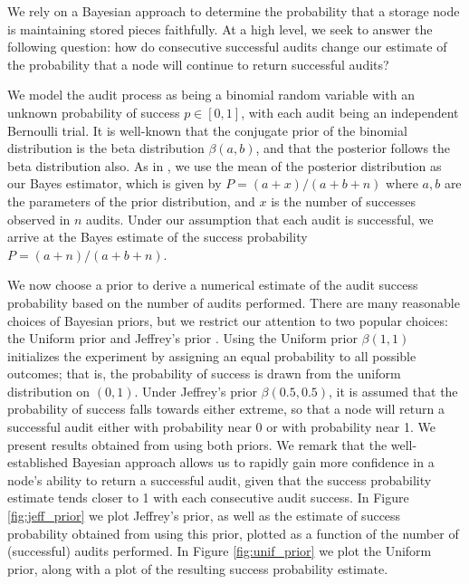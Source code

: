 We rely on a Bayesian approach to determine the probability
that a storage node is maintaining stored pieces faithfully.
At a high level, we seek to answer the following question:
how do consecutive successful audits change our estimate of
the probability that a node will continue to return successful audits?

We model the audit process as being a binomial random variable
with an unknown probability of success $p\in[0,1]$, with each audit
being an independent Bernoulli trial.
It is well-known that the conjugate prior of the binomial distribution
is the beta distribution $\beta(a,b)$,
and that the posterior follows the beta distribution also.
As in \cite{tumor-occurrence},
we use the mean of the posterior distribution as our Bayes
estimator, which is given by $P=(a+x)/(a+b+n)$ where $a,b$ are the parameters of
the prior distribution, and $x$ is the number of successes observed in $n$ audits.
Under our assumption that each audit is successful,
we arrive at the Bayes estimate of the success probability $P=(a+n)/(a+b+n)$.

We now choose a prior to derive a numerical estimate of the audit success probability
based on the number of audits performed.
There are many reasonable choices of Bayesian priors, but we restrict our attention to
two popular choices: the Uniform prior and Jeffrey's prior \cite{jeffrey}.
Using the Uniform prior $\beta(1,1)$ initializes the experiment
by assigning an equal probability to
all possible outcomes;
that is, the probability of success is drawn from the uniform
distribution on $(0,1)$.
Under Jeffrey's prior $\beta(0.5,0.5)$,
it is assumed that the probability of
success falls towards either extreme, so that a node will return a successful audit
either with probability near 0 or with probability near 1.
We present results obtained from using both priors.
We remark that the well-established Bayesian approach
allows us to rapidly gain more confidence
in a node's ability to return a successful audit,
given that the success probability estimate tends closer to 1
with each consecutive audit success. In Figure \ref{fig:jeff_prior} we plot
Jeffrey's prior, as well as the estimate of success probability obtained from using this prior, plotted as a function of the number of (successful) audits performed. In Figure \ref{fig:unif_prior} we plot the Uniform prior, along with a plot of the resulting success probability estimate.

